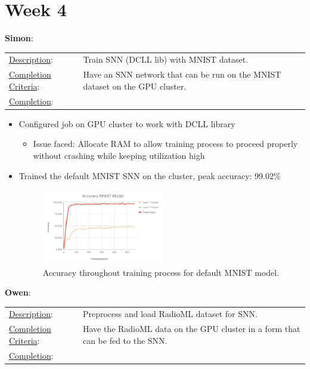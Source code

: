 \documentclass[parskip=true, 10pt]{scrartcl}
\begin{document}
\section*{Week 4}

\textbf{\textsf{Simon}}:

\begin{tabularx}{\textwidth}{p{3.5cm} p{10cm}}
\underline{Description}: & Train SNN (DCLL lib) with MNIST dataset.\\

\underline{Completion Criteria}: & Have an SNN network that can be run on the MNIST dataset on the GPU cluster.\\
\underline{Completion}: &
\end{tabularx}
 \begin{itemize}
    \item{Configured job on GPU cluster to work with DCLL library}
    \begin{itemize}
        \item{Issue faced: Allocate RAM to allow training process to proceed properly without crashing while keeping utilization high} 
    \end{itemize}
    \item{Trained the default MNIST SNN on the cluster, peak accuracy: 99.02\%
    \begin{figure}[H]
        \centering
        \includegraphics[width=0.5\textwidth]{mnist_original.pdf}
        \caption{Accuracy throughout training process for default MNIST model.}
    \end{figure}}
\end{itemize}

\textsf{\textbf{Owen}}:

\begin{tabularx}{\textwidth}{p{3.5cm} p{10cm}}
\underline{Description}: & Preprocess and load RadioML dataset for SNN.\\

\underline{Completion Criteria}: & Have the RadioML data on the GPU cluster in a form that can be fed to the SNN. \\
\underline{Completion}:
\end{tabularx}
\end{document}
